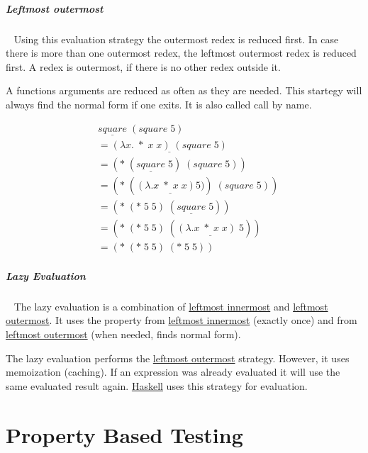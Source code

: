 \documentclass[11pt,twoside,landscape]{article}
\begin{document}
\begin{multicols}{3}
\subparagraph{Leftmost outermost} \
\label{sec:org973c27b}
Using this evaluation strategy the outermost redex is reduced first.
In case there is more than one outermost redex, the leftmost outermost redex is reduced first.
A redex is outermost, if there is no other redex outside it.

A functions arguments are reduced as often as they are needed.
This startegy will always find the normal form if one exits.
It is also called call by name.

\begin{equation}
  \label{blub}
  \begin{align}
    &\underline{square} \; (square \; 5) \\
    &= \underline{(\lambda x. \; * \; x \; x) \; (square \; 5)} \\
    &= (* \; (\underline{square} \; 5) \; (square \; 5)) \\
    &= (* \; (\underline{(\lambda .x \; * \; x \; x) 5)}) \; (square \; 5)) \\
    &= (* \; (* \; 5 \; 5) \; (\underline{square} \; 5)) \\
    &= (* \; (* \; 5 \; 5) \; (\underline{(\lambda .x \; * \; x \; x) \; 5})) \\
    &= (* \; (* \; 5 \; 5) \; (* \; 5 \; 5))
  \end{align}
\end{equation}

\subparagraph{Lazy Evaluation} \
\label{sec:orgc8658fc}
The lazy evaluation is a combination of \href{../../../roam/20220616093057-the_leftmost_innermost_evaluation_strategy.org}{leftmost innermost} and \href{../../../roam/20220616104603-the_leftmost_outermost_evaluation_strategy.org}{leftmost outermost}.
It uses the property from \href{../../../roam/20220616093057-the_leftmost_innermost_evaluation_strategy.org}{leftmost innermost} (exactly once) and from \href{../../../roam/20220616104603-the_leftmost_outermost_evaluation_strategy.org}{leftmost outermost} (when needed, finds normal form).

The lazy evaluation performs the \href{../../../roam/20220616104603-the_leftmost_outermost_evaluation_strategy.org}{leftmost outermost} strategy.
However, it uses memoization (caching).
If an expression was already evaluated it will use the same evaluated result again.
\href{../../../roam/20210618182407-haskell.org}{Haskell} uses this strategy for evaluation.

\section{Property Based Testing}
\label{sec:org5816406}
\end{multicols}
\end{document}
